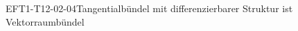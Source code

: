 
\begin{EXA}{EFT1-T12-02-04}{Tangentialbündel mit differenzierbarer Struktur ist Vektorraumbündel}
\end{EXA}
